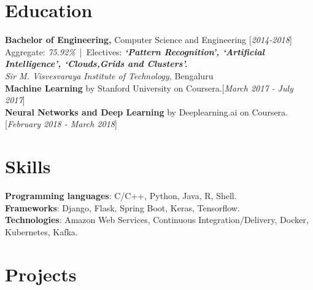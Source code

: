 \documentclass[10pt]{article}
\renewcommand{\textbf}[1]{{\bfseries\color{accent_darkest}#1}}
\begin{document}
\section*{Education} \textbf{Bachelor of Engineering,} Computer Science
and Engineering \hfill \textcolor{grey_darker}{[\textit{2014-2018}]}\\
Aggregate: \textit{75.92\%}\ |\ Electives: \textbf{\textit{`Pattern Recognition', `Artificial Intelligence',
`Clouds,Grids and Clusters'.}}\\
\textit{Sir M. Visvesvaraya Institute of Technology,} Bengaluru
\medskip
\\
\textbf{Machine Learning} by Stanford University on Coursera.\hfill  \textcolor{grey_darker}{[\textit
{March 2017 - July 2017}]}
\medskip\\ 
\textbf{Neural Networks and Deep Learning} by Deeplearning.ai on Coursera.\hfill  \textcolor{grey_darker}{[\textit
{February 2018 - March 2018}]}\\

\section*{Skills} 
\textbf{Programming languages}: C/C++, Python, Java, R, Shell.\\
\textbf{Frameworks}: Django, Flask, Spring Boot, Keras, Tensorflow.\\
\textbf{Technologies}: Amazon Web Services, Continuous Integration/Delivery, Docker, Kubernetes, Kafka. 

\section*{Projects}
\end{document}
